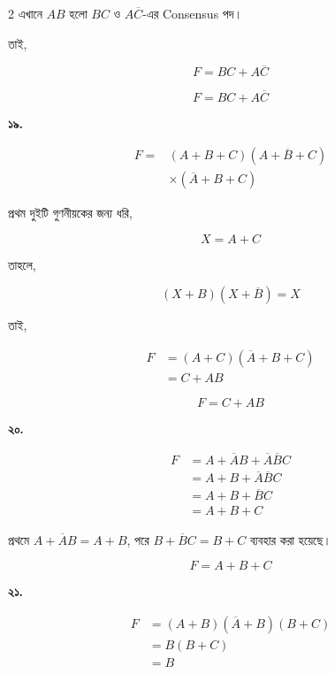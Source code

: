 \begin{multicols}{2}
এখানে \(AB\) হলো \(BC\) ও \(A\overline C\)-এর
\textenglish{Consensus} পদ।

তাই,

\[
F=BC+A\overline C
\]

\[
\boxed{F=BC+A\overline C}
\]

\medskip


\textbf{১৯.}

\[
\begin{aligned}
F
={}&(A+B+C)(A+\overline B+C)\\
&\times(\overline A+B+C)
\end{aligned}
\]

প্রথম দুইটি গুণনীয়কের জন্য ধরি,

\[
X=A+C
\]

তাহলে,

\[
(X+B)(X+\overline B)=X
\]

তাই,

\[
\begin{aligned}
F
&=(A+C)(\overline A+B+C)\\
&=C+AB
\end{aligned}
\]

\[
\boxed{F=C+AB}
\]

\medskip


\textbf{২০.}

\[
\begin{aligned}
F
&=A+\overline AB+\overline A\overline BC\\
&=A+B+\overline A\overline BC\\
&=A+B+\overline BC\\
&=A+B+C
\end{aligned}
\]

{\footnotesize
প্রথমে \(A+\overline AB=A+B\),
পরে \(B+\overline BC=B+C\) ব্যবহার করা হয়েছে।
}

\[
\boxed{F=A+B+C}
\]

\medskip


\textbf{২১.}

\[
\begin{aligned}
F
&=(A+B)(\overline A+B)(B+C)\\
&=B(B+C)\\
&=B
\end{aligned}
\]


\end{multicols}
